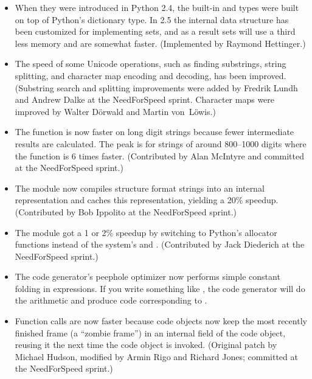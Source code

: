\documentclass{howto}
\begin{document}
\begin{itemize}

\item When they were introduced 
in Python 2.4, the built-in  and  types
were built on top of Python's dictionary type.  
In 2.5 the internal data structure has been customized for implementing sets,
and as a result sets will use a third less memory and are somewhat faster.
(Implemented by Raymond Hettinger.)

\item The speed of some Unicode operations, such as finding
substrings, string splitting, and character map encoding and decoding,
has been improved.  (Substring search and splitting improvements were
added by Fredrik Lundh and Andrew Dalke at the NeedForSpeed
sprint. Character maps were improved by Walter D\"orwald and
Martin von~L\"owis.)

\item The  function is now
faster on long digit strings because fewer intermediate results are
calculated.  The peak is for strings of around 800--1000 digits where 
the function is 6 times faster.
(Contributed by Alan McIntyre and committed at the NeedForSpeed sprint.)

\item The  module now compiles structure format 
strings into an internal representation and caches this
representation, yielding a 20\% speedup.  (Contributed by Bob Ippolito
at the NeedForSpeed sprint.)

\item The  module got a 1 or 2\% speedup by switching to 
Python's allocator functions instead of the system's 
 and .
(Contributed by Jack Diederich at the NeedForSpeed sprint.)

\item The code generator's peephole optimizer now performs
simple constant folding in expressions.  If you write something like
, the code generator will do the arithmetic and produce
code corresponding to .

\item Function calls are now faster because code objects now keep 
the most recently finished frame (a ``zombie frame'') in an internal
field of the code object, reusing it the next time the code object is
invoked.  (Original patch by Michael Hudson, modified by Armin Rigo
and Richard Jones; committed at the NeedForSpeed sprint.)


\end{itemize}
\end{document}
